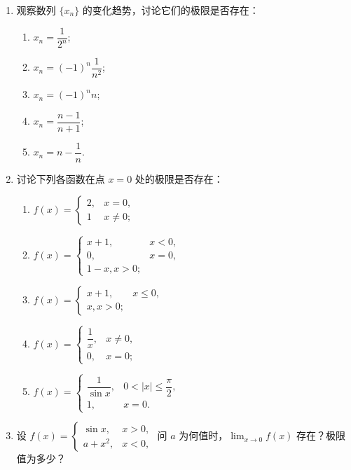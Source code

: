 \begin{enumerate}\setlength{\itemsep}{7pt}
    \item 观察数列 $\{x_n\}$ 的变化趋势，讨论它们的极限是否存在：
    \begin{enumerate}[(1)]\setlength{\itemsep}{5pt}\setlength{\topsep}{15pt}
        \item $x_n=\dfrac{1}{2^n}$;
        \item $x_n=(-1)^n\dfrac{1}{n^2}$;
        \item $x_n=(-1)^nn$;
        \item $x_n=\dfrac{n-1}{n+1}$;
        \item $x_n=n-\dfrac{1}{n}$.
    \end{enumerate}

    \item 讨论下列各函数在点 $x=0$ 处的极限是否存在：
    \begin{enumerate}[(1)]\setlength{\itemsep}{5pt}\setlength{\topsep}{15pt}
        \item $f(x)=\begin{cases}
            2,&x=0,\\
            1&x\not=0;
        \end{cases}$
        \item $f(x)=\begin{cases}
            x+1,&x<0,\\
            0,&x=0,\\
            1-x,x>0;
        \end{cases}$
        \item $f(x)=\begin{cases}
            x+1,&x\leqslant0,\\
            x,x>0;
        \end{cases}$
        \item $f(x)=\begin{cases}
            \dfrac{1}{x},&x\not=0,\\
            0,&x=0;
        \end{cases}$
        \item $f(x)=\begin{cases}
            \dfrac{1}{\sin x},&0<|x|\leqslant\dfrac{\pi}{2},\\
            1,&x=0.
        \end{cases}$
    \end{enumerate}

    \item 设 $f(x)=\begin{cases}
        \sin x,&x>0,\\
        a+x^2,&x<0,
    \end{cases}$ 问 $a$ 为何值时，$\displaystyle\lim_{x\to0}f(x)$ 存在？极限值为多少？


\end{enumerate}
